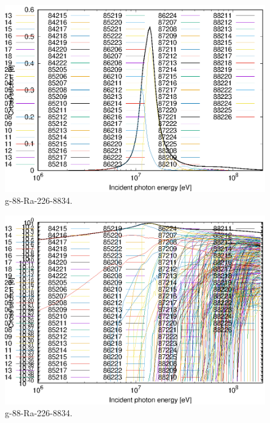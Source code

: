 \begin{figure}
 \includegraphics[width=\linewidth]{eps/g_88-Ra-226_8834.eps}
  \caption{g-88-Ra-226-8834.}
\end{figure}
\begin{figure}
 \includegraphics[width=\linewidth]{eps-log/g_88-Ra-226_8834.eps}
 \caption{g-88-Ra-226-8834.}
\end{figure}
\newpage \clearpage

